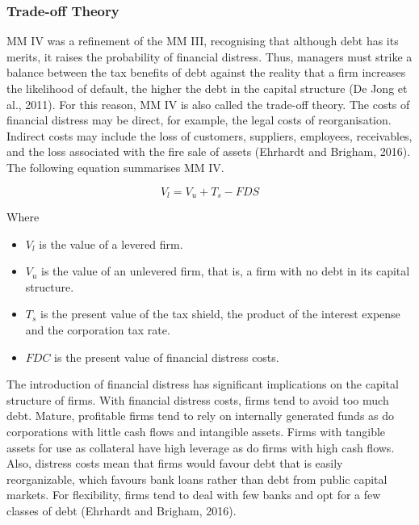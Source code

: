 \documentclass[a4paper, nobind]{templates/ociamthesis}
\providecommand{\tightlist}{%
  \setlength{\itemsep}{0pt}\setlength{\parskip}{0pt}}
\begin{document}
\hypertarget{trade-off-theory}{%
\subsubsection{Trade-off Theory}\label{trade-off-theory}}

\noindent MM IV was a refinement of the MM III, recognising that although debt has its merits, it raises the probability of financial distress. Thus, managers must strike a balance between the tax benefits of debt against the reality that a firm increases the likelihood of default, the higher the debt in the capital structure (De Jong et al., 2011). For this reason, MM IV is also called the trade-off theory. The costs of financial distress may be direct, for example, the legal costs of reorganisation. Indirect costs may include the loss of customers, suppliers, employees, receivables, and the loss associated with the fire sale of assets (Ehrhardt and Brigham, 2016). The following equation summarises MM IV.

\begin{equation}
V_{l} = V_{u} + T_{s} - FDS
\end{equation}

Where

\begin{itemize}
\tightlist
\item
  \(V_l\) is the value of a levered firm.
\item
  \(V_u\) is the value of an unlevered firm, that is, a firm with no debt in its capital structure.
\item
  \(T_s\) is the present value of the tax shield, the product of the interest expense and the corporation tax rate.
\item
  \(FDC\) is the present value of financial distress costs.
\end{itemize}

The introduction of financial distress has significant implications on the capital structure of firms. With financial distress costs, firms tend to avoid too much debt. Mature, profitable firms tend to rely on internally generated funds as do corporations with little cash flows and intangible assets. Firms with tangible assets for use as collateral have high leverage as do firms with high cash flows. Also, distress costs mean that firms would favour debt that is easily reorganizable, which favours bank loans rather than debt from public capital markets. For flexibility, firms tend to deal with few banks and opt for a few classes of debt (Ehrhardt and Brigham, 2016).
\end{document}
